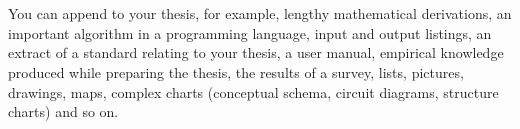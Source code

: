 \documentclass[12pt,a4paper,finnish]{tutthesis}
\begin{document}
\chapter*{\appB}                       %
\label{app:B}
\markboth{\appB}{\appB}                     


You can append to your thesis, for example, lengthy mathematical
derivations, an important algorithm in a programming language, input
and output listings, an extract of a standard relating to your thesis,
a user manual, empirical knowledge produced while preparing the
thesis, the results of a survey, lists, pictures, drawings, maps,
complex charts (conceptual schema, circuit diagrams, structure charts)
and so on.


%
\end{document}
